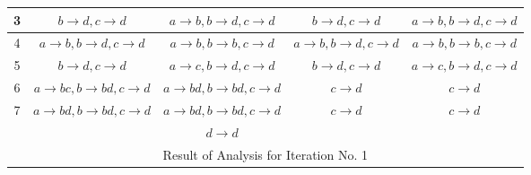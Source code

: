 \documentclass[12pt]{article}
\begin{document}
\begin{enumerate}
{\begin{center}
\begin{tabular}{|c||c|c||c|c|}
    3 & $b\rightarrow d, c \rightarrow d$ & $a
   \rightarrow b, b\rightarrow d,
    c \rightarrow d$ & $b\rightarrow d, c \rightarrow d$ & $a
   \rightarrow b, b\rightarrow d, c \rightarrow d$ \\ \hline
    4 & $a \rightarrow b, b\rightarrow d,
    c \rightarrow d$ & $a \rightarrow b, b\rightarrow b,
    c \rightarrow d$ & $a \rightarrow b, b\rightarrow d,
    c \rightarrow d$ & $a \rightarrow b, b\rightarrow b,
    c \rightarrow d$ \\ \hline
    5 & $ b\rightarrow d,
    c \rightarrow d$ & $a \rightarrow c, b\rightarrow d,
    c \rightarrow d$ & $b\rightarrow d,
    c \rightarrow d$ &$a \rightarrow c, b\rightarrow d,
    c \rightarrow d$  \\ \hline
    6 & $a \rightarrow b c, b\rightarrow b d,
    c \rightarrow d$ & $a \rightarrow b d, b\rightarrow b d,
    c \rightarrow d$ & $c \rightarrow d$ & $c \rightarrow d$ \\ \hline
    7 & $a \rightarrow b d, b\rightarrow b d,
    c \rightarrow d$ & $a \rightarrow b d, b\rightarrow b d,
    c \rightarrow d $ & $c \rightarrow d$ & $c \rightarrow d$\\
    & & $d \rightarrow d$ & &  \\ \hline
    \multicolumn{5}{c}{  Result of Analysis for Iteration
      No. 1 }
  \end{tabular}
\end{center}

}
\end{enumerate}
\end{document}
